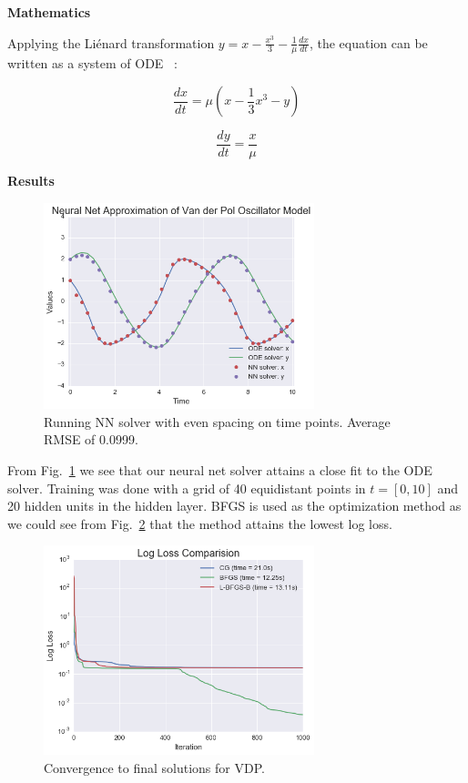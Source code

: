 \documentclass[11pt]{article}
\begin{document}
\textbf{Mathematics}

Applying the Li\'enard transformation $y = x - \frac{x^3}{3} - \frac{1}{\mu}\frac{dx}{dt}$, the equation can be written as a system of ODE ~\cite{REF5}:

     \begin{equation}
      \frac{dx}{dt} = \mu(x - \frac{1}{3}x^3 - y)
      \label{eq:VDP1}
    \end{equation}
    
     \begin{equation}
      \frac{dy}{dt} = \frac{x}{\mu}
      \label{eq:VDP2}
    \end{equation}
    
\textbf{Results}

\begin{figure}
\centering
\includegraphics[width=0.7\textwidth]{VDP_uniform_good.png}
      \caption{Running NN solver with even spacing on time points. Average RMSE of 0.0999. \label{fig:VDP_uniform}}
\end{figure}

From Fig.~\ref{fig:VDP_uniform} we see that our neural net solver attains a close fit to the ODE solver. Training was done with a grid of 40 equidistant points in $t = [0, 10]$ and 20 hidden units in the hidden layer. BFGS is used as the optimization method as we could see from Fig.~\ref{fig:loss_VDP} that the method attains the lowest log loss.

\begin{figure}
\centering
\includegraphics[width=0.7\textwidth]{lossMethod_VDP.png}
      \caption{Convergence to final solutions for VDP. \label{fig:loss_VDP}}
\end{figure}
\end{document}

